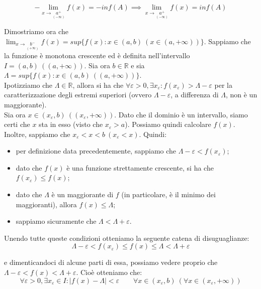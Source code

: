 \documentclass{article}
\begin{document}
\begin{equation*}
    - \lim_{x \to \underset{\scriptstyle (-\infty)}{a^+}} f(x) = - inf(A) \implies \lim_{x \to \underset{\scriptstyle (-\infty)}{a^+}} f(x) = inf(A)
\end{equation*}

\noindent Dimostriamo ora che $\lim_{x \to \underset{\scriptstyle (+\infty)}{b^-}} f(x) = sup\{f(x) : x \in (a, b) \ (x \in (a, +\infty))\}$. Sappiamo che la funzione è monotona crescente ed è definita nell'intervallo $I = (a, b) \ ((a, + \infty))$. Sia ora $b \in \mathbb{R}$ e sia $\Lambda = sup\{f(x) : x \in (a, b) \ ((a, +\infty))\}$.\\
Ipotizziamo che $\Lambda \in \mathbb{R}$, allora si ha che $\forall \varepsilon > 0, \exists x_\varepsilon : f(x_\varepsilon) > \Lambda - \varepsilon$ per la caratterizzazione degli estremi superiori (ovvero $\Lambda - \varepsilon$, a differenza di $\Lambda$, non è un maggiorante). \\
Sia ora $x \in (x_\varepsilon, b) \ ((x_\varepsilon, +\infty))$. Dato che il dominio è un intervallo, siamo certi che $x$ sta in esso (visto che $x_\varepsilon > a$). Possiamo quindi calcolare $f(x)$. Inoltre, sappiamo che $x_\varepsilon < x < b \ (x_\varepsilon < x)$. Quindi:

\begin{itemize}
    \item per definizione data precedentemente, sappiamo che $\Lambda - \varepsilon < f(x_\varepsilon)$;
    \item dato che $f(x)$ è una funzione strettamente crescente, si ha che $f(x_\varepsilon) \leq f(x)$;
    \item dato che $\Lambda$ è un maggiorante di $f$ (in particolare, è il minimo dei maggioranti), allora $f(x) \leq \Lambda$;
    \item sappiamo sicuramente che $\Lambda < \Lambda + \varepsilon$.
\end{itemize}

\noindent Unendo tutte queste condizioni otteniamo la seguente catena di disuguaglianze:
\begin{equation*}
    \Lambda - \varepsilon < f(x_\varepsilon) \leq f(x) \leq \Lambda < \Lambda + \varepsilon
\end{equation*}

\noindent e dimenticandoci di alcune parti di essa, possiamo vedere proprio che $\Lambda - \varepsilon < f(x) < \Lambda + \varepsilon$. Cioè otteniamo che:
\begin{equation*}
    \forall \varepsilon > 0, \exists x_\varepsilon \in I : |f(x) - \Lambda| < \varepsilon \qquad \forall x \in (x_\varepsilon, b) \ (\forall x \in (x_\varepsilon, +\infty))
\end{equation*}
\end{document}
